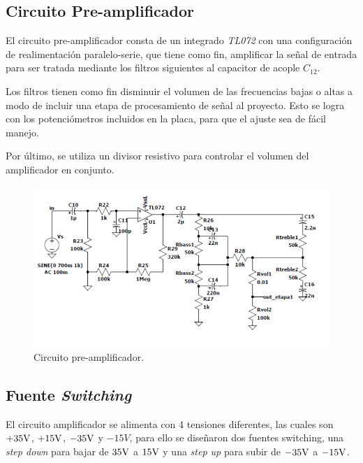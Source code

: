\subsection{Circuito Pre-amplificador}

\par El circuito pre-amplificador consta de un integrado \textit{TL072} con una configuración de realimentación paralelo-serie, que tiene como fin, amplificar la señal de entrada para ser tratada mediante los filtros siguientes al capacitor de acople $C_{12}$.\\

\par Los filtros tienen como fin disminuir el volumen de las frecuencias bajas o altas a modo de incluir una etapa de procesamiento de señal al proyecto. Esto se logra con los potenciómetros incluidos en la placa, para que el ajuste sea de fácil manejo.\\

\par Por último, se utiliza un divisor resistivo para controlar el volumen del amplificador en conjunto.\\

\begin{figure}[H]
    \centering
    \includegraphics[scale=.7]{img/circuito/pre_amplificador.PNG}
    \caption{Circuito pre-amplificador.}
    \label{fig:ciruito_pre}
\end{figure}

\subsection{Fuente \textit{Switching}}

\par El circuito amplificador se alimenta con 4 tensiones diferentes, las cuales son $+35 \si[per-mode=symbol]{\volt}$, $+15 \si[per-mode=symbol]{\volt}$, $-35 \si[per-mode=symbol]{\volt}$ y $-15V$, para ello se diseñaron dos fuentes switching, una \textit{step down} para bajar de $35 \si[per-mode=symbol]{\volt}$ a $15 \si[per-mode=symbol]{\volt}$ y una \textit{step up} para subir de $-35 \si[per-mode=symbol]{\volt}$ a $-15 \si[per-mode=symbol]{\volt}$.\\

